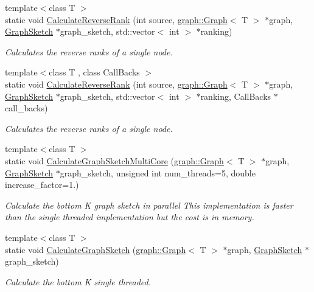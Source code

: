 \begin{DoxyCompactItemize}
\item 
{\footnotesize template$<$class T $>$ }\\static void \hyperlink{namespaceall__distance__sketch_a025f777de5a9df1594dd306f9037f385}{Calculate\+Reverse\+Rank} (int source, \hyperlink{classall__distance__sketch_1_1graph_1_1Graph}{graph\+::\+Graph}$<$ T $>$ $\ast$graph, \hyperlink{classall__distance__sketch_1_1GraphSketch}{Graph\+Sketch} $\ast$graph\+\_\+sketch, std\+::vector$<$ int $>$ $\ast$ranking)
\begin{DoxyCompactList}\small\item\em Calculates the reverse ranks of a single node. \end{DoxyCompactList}\item 
{\footnotesize template$<$class T , class Call\+Backs $>$ }\\static void \hyperlink{namespaceall__distance__sketch_acd397719d04e49914cac475154a15735}{Calculate\+Reverse\+Rank} (int source, \hyperlink{classall__distance__sketch_1_1graph_1_1Graph}{graph\+::\+Graph}$<$ T $>$ $\ast$graph, \hyperlink{classall__distance__sketch_1_1GraphSketch}{Graph\+Sketch} $\ast$graph\+\_\+sketch, std\+::vector$<$ int $>$ $\ast$ranking, Call\+Backs $\ast$call\+\_\+backs)
\begin{DoxyCompactList}\small\item\em Calculates the reverse ranks of a single node. \end{DoxyCompactList}\item 
{\footnotesize template$<$class T $>$ }\\static void \hyperlink{namespaceall__distance__sketch_a7fea917111c3851d7c909e896fbad571}{Calculate\+Graph\+Sketch\+Multi\+Core} (\hyperlink{classall__distance__sketch_1_1graph_1_1Graph}{graph\+::\+Graph}$<$ T $>$ $\ast$graph, \hyperlink{classall__distance__sketch_1_1GraphSketch}{Graph\+Sketch} $\ast$graph\+\_\+sketch, unsigned int num\+\_\+threads=5, double increase\+\_\+factor=1.)
\begin{DoxyCompactList}\small\item\em Calculate the bottom K graph sketch in parallel This implementation is faster than the single threaded implementation but the cost is in memory. \end{DoxyCompactList}\item 
{\footnotesize template$<$class T $>$ }\\static void \hyperlink{namespaceall__distance__sketch_a1e07f2d9df73bee36e926822ce0bb2ea}{Calculate\+Graph\+Sketch} (\hyperlink{classall__distance__sketch_1_1graph_1_1Graph}{graph\+::\+Graph}$<$ T $>$ $\ast$graph, \hyperlink{classall__distance__sketch_1_1GraphSketch}{Graph\+Sketch} $\ast$graph\+\_\+sketch)
\begin{DoxyCompactList}\small\item\em Calculate the bottom K single threaded. \end{DoxyCompactList}\end{DoxyCompactItemize}


